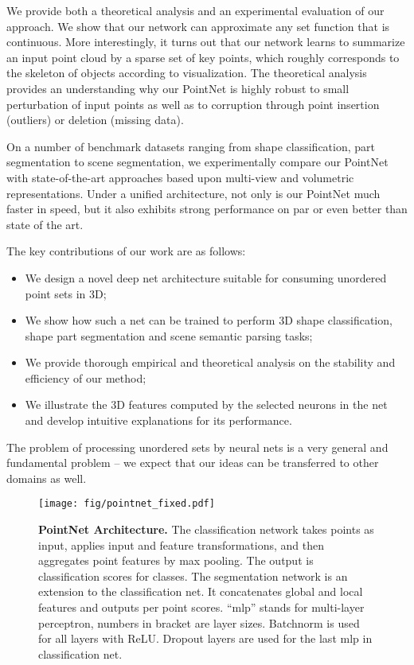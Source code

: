 \documentclass[10pt,twocolumn,letterpaper]{article}
\newcommand{\denselist}{\itemsep 0pt\parsep=0pt\partopsep 0pt\vspace{-2pt}}
\newcommand{\bitem}{\begin{itemize}\denselist}
\newcommand{\eitem}{\end{itemize}}
\begin{document}
We provide both a theoretical analysis and an experimental evaluation of our approach. We show that our network can approximate any set function that is continuous. More interestingly, it turns out that our network learns to summarize an input point cloud by a sparse set of key points, which roughly corresponds to the skeleton of objects according to visualization. The theoretical analysis provides an understanding why our PointNet is highly robust to small perturbation of input points as well as to corruption through point insertion (outliers) or deletion (missing data).

On a number of benchmark datasets ranging from shape classification, part segmentation to scene segmentation, we experimentally compare our PointNet with state-of-the-art approaches based upon multi-view and volumetric representations. Under a unified architecture, not only is our PointNet much faster in speed, but it also exhibits strong performance on par or even better than state of the art. 


The key contributions of our work are as follows:
\bitem
\item We design a novel deep net architecture suitable for consuming unordered point sets in 3D;
\item We show how such a net can be trained to perform 3D shape classification, shape part segmentation and scene semantic parsing tasks;
\item We provide thorough empirical and theoretical analysis on the stability and efficiency of our method;
\item We illustrate the 3D features computed by the selected neurons in the net and develop intuitive explanations for its performance.
\eitem

The problem of processing unordered sets by neural nets is a very general and fundamental problem -- we expect that our ideas can be transferred to other domains as well.

\begin{figure*}[th!]
    \centering
    \texttt{[image: fig/pointnet\_fixed.pdf]}
    \caption{\textbf{PointNet Architecture.} The classification network takes  points as input, applies input and feature transformations, and then aggregates point features by max pooling. The output is classification scores for  classes. The segmentation network is an extension to the classification net. It concatenates global and local features and outputs per point scores. ``mlp'' stands for multi-layer perceptron, numbers in bracket are layer sizes. Batchnorm is used for all layers with ReLU. Dropout layers are used for the last mlp in classification net.}
    \label{fig:pointnet_arch}
\end{figure*} 
\end{document}

